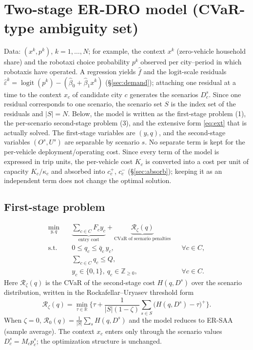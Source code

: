 \documentclass[10pt,a4paper]{article}
\DeclareMathOperator{\logit}{logit}
\begin{document}

\section{Two-stage ER-DRO model (CVaR-type ambiguity set)}

Data: $(x^k,p^k)$, $k=1,\dots,N$; for example, the context $x^k$ (zero-vehicle household share) and the robotaxi choice probability $p^k$ observed per city--period in which robotaxis have operated. A regression yields $\hat f$ and the logit-scale residuals $\hat\varepsilon^k=\logit(p^k)-(\hat\beta_0+\hat\beta_1x^k)$ (\S\ref{sec:demand}); attaching one residual at a time to the context $x_c$ of candidate city $c$ generates the scenarios $D_c^s$. Since one residual corresponds to one scenario, the scenario set $S$ is the index set of the residuals and $|S|=N$.
Below, the model is written as the first-stage problem (1), the per-scenario second-stage problem (3), and the extensive form \eqref{eq:ext} that is actually solved. The first-stage variables are $(y,q)$, and the second-stage variables $(O^s,U^s)$ are separable by scenario $s$.
No separate term is kept for the per-vehicle deployment/operating cost. Since every term of the model is expressed in trip units, the per-vehicle cost $K_c$ is converted into a cost per unit of capacity $K_c/\kappa_c$ and absorbed into $c_c^+$, $c_c^-$ (\S\ref{sec:absorb}); keeping it as an independent term does not change the optimal solution.

\subsection{First-stage problem}

\begin{subequations}\label{eq:first}
\begin{align}
\min_{y,q}\quad
 & \underbrace{\sum_{c\in C}F_c y_c}_{\text{entry cost}}
 + \underbrace{\mathcal R_\zeta(q)}_{\text{CVaR of scenario penalties}} \label{eq:1a}\\
\text{s.t.}\quad
 & 0\le q_c\le \bar q_c\,y_c, && \forall c\in C, \label{eq:1b}\\
 & \sum_{c\in C} q_c\le Q, \label{eq:1c}\\
 & y_c\in\{0,1\},\ q_c\in\mathbb Z_{\ge 0}, && \forall c\in C. \label{eq:1d}
\end{align}
\end{subequations}
Here $\mathcal R_\zeta(q)$ is the CVaR of the second-stage cost $H(q,D^s)$ over the scenario distribution, written in the Rockafellar--Uryasev threshold form
\begin{equation}\label{eq:cvar}
\mathcal R_\zeta(q)=\min_{\tau\in\mathbb R}\Big\{\tau+\frac{1}{|S|(1-\zeta)}\sum_{s\in S}\big(H(q,D^s)-\tau\big)^+\Big\}.
\end{equation}
When $\zeta=0$, $\mathcal R_0(q)=\frac1{|S|}\sum_s H(q,D^s)$ and the model reduces to ER-SAA (sample average). The context $x_c$ enters only through the scenario values $D_c^s=M_c p_c^s$; the optimization structure is unchanged.
\end{document}
